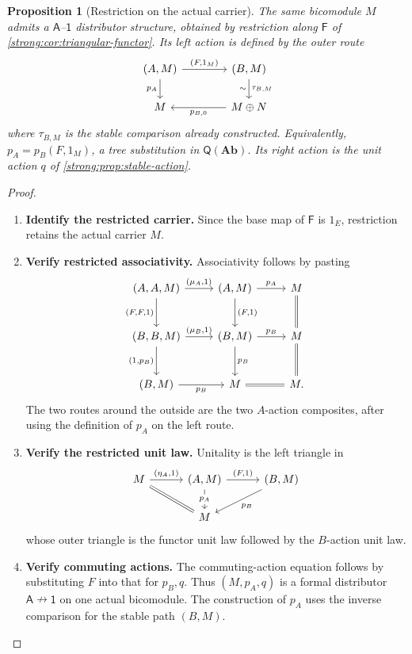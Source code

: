 \documentclass[11pt,reqno]{amsart}
\theoremstyle{plain}
\newtheorem{proposition}[theorem]{Proposition}
\theoremstyle{definition}
\theoremstyle{remark}
\numberwithin{equation}{section}
\newcommand{\Q}{\mathsf Q}
\newcommand{\harr}{\mathrel{\nrightarrow}}
\newcommand{\Ab}{\mathbf{Ab}}
\newcommand{\Icat}{\mathsf 1}
\begin{document}
\begin{proposition}[Restriction on the actual carrier]\label{strong:prop:restricted-action}
The same bicomodule $M$ admits a $\mathsf A$--$\Icat$ distributor
structure, obtained by restriction along
$\mathsf F$ of \cref{strong:cor:triangular-functor}. Its left action
is defined by the outer route
\begin{equation}\label{strong:eq:pA}
\begin{tikzcd}[column sep=4em]
(A,M) \arrow[r,"{(F,1_M)}"] \arrow[d,"p_A"'] &
(B,M) \arrow[d,"\tau_{B,M}","\sim"']\\
M & M\oplus N \arrow[l,"p_{B,0}"]
\end{tikzcd}
\end{equation}
where $\tau_{B,M}$ is the stable comparison already constructed.
Equivalently, $p_A=p_B(F,1_M)$, a tree substitution in $\Q(\Ab)$.
Its right action is the unit action $q$ of
\cref{strong:prop:stable-action}.
\end{proposition}
\begin{proof}\leavevmode
\begin{enumerate}
\item \textbf{Identify the restricted carrier.} Since the base map of $\mathsf F$ is $1_E$, restriction retains the
actual carrier $M$.

\item \textbf{Verify restricted associativity.} Associativity follows by pasting
\[
\begin{tikzcd}[column sep=2.5em,row sep=2.6em]
(A,A,M) \arrow[r,"{(\mu_A,1)}"] \arrow[d,"{(F,F,1)}"'] &
(A,M) \arrow[r,"p_A"] \arrow[d,"{(F,1)}"] &
M \arrow[d,equal]\\
(B,B,M) \arrow[r,"{(\mu_B,1)}"] \arrow[d,"{(1,p_B)}"'] &
(B,M) \arrow[r,"p_B"] \arrow[d,"p_B"] &
M \arrow[d,equal]\\
(B,M) \arrow[r,"p_B"'] & M \arrow[r,equal] & M.
\end{tikzcd}
\]
The two routes around the outside are the two $A$-action composites,
after using the definition of $p_A$ on the left route.

\item \textbf{Verify the restricted unit law.} Unitality is the left triangle in
\[
\begin{tikzcd}[column sep=3em]
M \arrow[r,"{(\eta_A,1)}"] \arrow[dr,equal] &
(A,M) \arrow[r,"{(F,1)}"] \arrow[d,"p_A" description] &
(B,M) \arrow[dl,"p_B"]\\
& M &
\end{tikzcd}
\]
whose outer triangle is the functor unit law followed by the $B$-action
unit law.

\item \textbf{Verify commuting actions.} The commuting-action equation follows by substituting $F$ into that for
$p_B,q$. Thus $(M,p_A,q)$ is a formal distributor
$\mathsf A\harr\Icat$ on one actual bicomodule. The construction of
$p_A$ uses the inverse comparison for the stable path $(B,M)$.\qedhere
\end{enumerate}
\end{proof}
\end{document}
